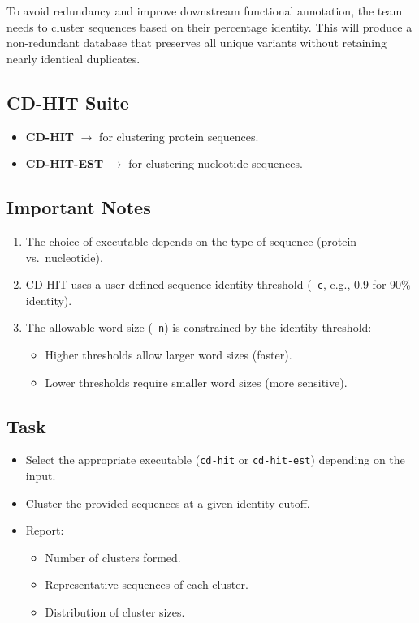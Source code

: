 \documentclass[12pt]{article}
\begin{document}
To avoid redundancy and improve downstream functional annotation, the team needs to cluster sequences based on their percentage identity. This will produce a non-redundant database that preserves all unique variants without retaining nearly identical duplicates.

\subsection*{CD-HIT Suite}
\begin{itemize}[leftmargin=1.2cm]
    \item \textbf{CD-HIT} $\rightarrow$ for clustering protein sequences.
    \item \textbf{CD-HIT-EST} $\rightarrow$ for clustering nucleotide sequences.
\end{itemize}

\subsection*{Important Notes}
\begin{enumerate}[leftmargin=1.2cm]
    \item The choice of executable depends on the type of sequence (protein vs.~nucleotide).
    \item CD-HIT uses a user-defined sequence identity threshold (\texttt{-c}, e.g., $0.9$ for 90\% identity).
    \item The allowable word size (\texttt{-n}) is constrained by the identity threshold:
    \begin{itemize}
        \item Higher thresholds allow larger word sizes (faster).
        \item Lower thresholds require smaller word sizes (more sensitive).
    \end{itemize}
\end{enumerate}

\subsection*{Task}
\begin{itemize}[leftmargin=1.2cm]
    \item Select the appropriate executable (\texttt{cd-hit} or \texttt{cd-hit-est}) depending on the input.
    \item Cluster the provided sequences at a given identity cutoff.
    \item Report:
    \begin{itemize}
        \item Number of clusters formed.
        \item Representative sequences of each cluster.
        \item Distribution of cluster sizes.
    \end{itemize}
\end{itemize}
\end{document}
